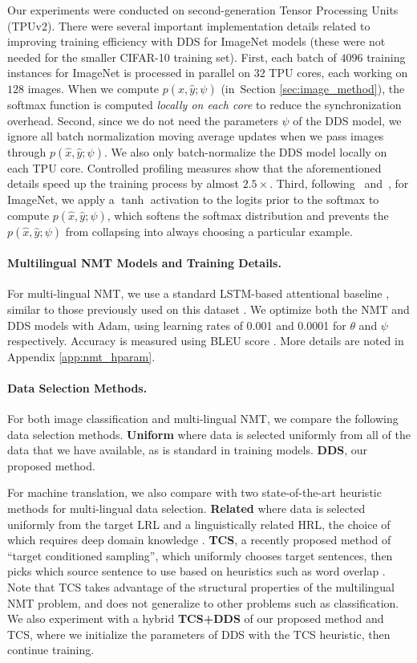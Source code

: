 Our experiments were conducted on second-generation Tensor Processing Units (TPUv2). There were several important implementation details related to improving training efficiency with DDS for ImageNet models (these were not needed for the smaller CIFAR-10 training set). First, each batch of $4096$ training instances for ImageNet is processed in parallel on $32$ TPU cores, each working on $128$ images. When we compute $p(\hat{x}, \hat{y}; \psi)$ (in~Section \ref{sec:image_method}), the softmax function is computed \textit{locally on each core} to reduce the synchronization overhead. Second, since we do not need the parameters $\psi$ of the DDS model, we ignore all batch normalization moving average updates when we pass images through $p(\hat{x}, \hat{y}; \psi)$. We also only batch-normalize the DDS model locally on each TPU core. Controlled profiling measures show that the aforementioned details speed up the training process by almost $2.5 \times$. Third, following~\citet{neural_combi} and~\citet{enas}, for ImageNet, we apply a $\tanh$ activation to the logits prior to the softmax to compute $p(\hat{x}, \hat{y}; \psi)$, which softens the softmax distribution and prevents the $p(\hat{x}, \hat{y}; \psi)$ from collapsing into always choosing a particular example.

\paragraph{Multilingual NMT Models and Training Details.}
For multi-lingual NMT, we use a standard LSTM-based attentional baseline \cite{bahdanau}, similar to those previously used on this dataset \cite{rapid_adapt_nmt}.
We optimize both the NMT and DDS models with Adam, using learning rates of 0.001 and 0.0001 for $\theta$ and $\psi$ respectively.
Accuracy is measured using BLEU score \cite{papineni}.
More details are noted in Appendix \ref{app:nmt_hparam}.

\paragraph{Data Selection Methods.}
For both image classification and multi-lingual NMT, we compare the following data selection methods.
\textbf{Uniform} where data is selected uniformly from all of the data that we have available, as is standard in training models.
\textbf{DDS}, our proposed method.

For machine translation, we also compare with two state-of-the-art heuristic methods for multi-lingual data selection.
\textbf{Related} where data is selected uniformly from the target LRL and a linguistically related HRL, the choice of which requires deep domain knowledge \cite{rapid_adapt_nmt}.
\textbf{TCS}, a recently proposed method of ``target conditioned sampling'', which uniformly chooses target sentences, then picks which source sentence to use based on heuristics such as word overlap \cite{TCS}.
Note that TCS takes advantage of the structural properties of the multilingual NMT problem, and does not generalize to other problems such as classification.
We also experiment with a hybrid \textbf{TCS+DDS} of our proposed method and TCS, where we initialize the parameters of DDS with the TCS heuristic, then continue training.

